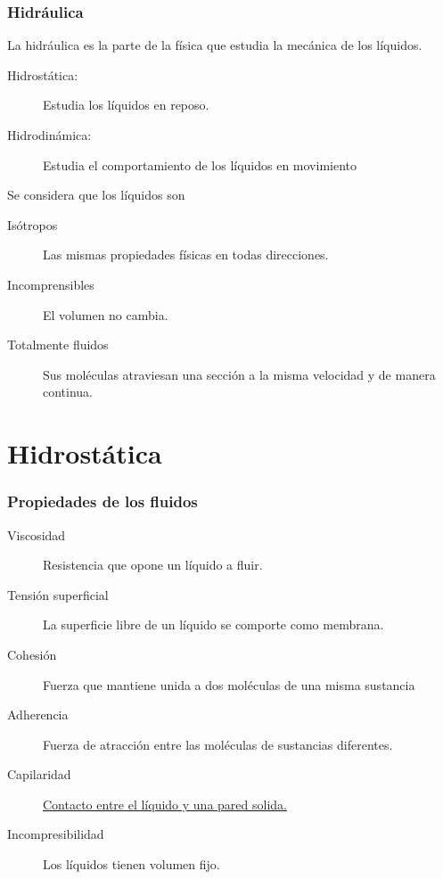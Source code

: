 \documentclass[handout]{beamer}
\begin{document}
\begin{frame}
  \frametitle{Hidráulica}  
  \begin{block}{La hidráulica}
    es la parte de la física que estudia la mecánica de los líquidos.
  \end{block}
  \begin{description}
  \item[Hidrostática:] Estudia los líquidos en reposo.
  \item[Hidrodinámica:] Estudia el comportamiento de los líquidos en movimiento
  \end{description}

  \begin{block}{Se considera que los líquidos son}
    \begin{description}
    \item[Isótropos] Las mismas propiedades físicas en todas direcciones.
    \item[Incomprensibles] El volumen no cambia.
    \item[Totalmente fluidos] Sus moléculas atraviesan una sección a la misma velocidad y
      de manera continua.
    \end{description}
  \end{block}
\end{frame}

\section{Hidrostática}

\begin{frame}
  \frametitle{Propiedades de los fluidos}
  \begin{description}
  \item[Viscosidad] Resistencia que opone un líquido a fluir.
  \item[Tensión superficial] La superficie libre de un líquido se comporte como membrana.
  \item[Cohesión ] Fuerza que mantiene unida a dos moléculas de una misma sustancia
  \item[Adherencia] Fuerza de atracción entre las moléculas de sustancias diferentes.
  \item[Capilaridad] \href{https://www.youtube.com/watch?v=s-KvoVzukHo}{Contacto entre el líquido y una pared solida.}
  \item[Incompresibilidad] Los líquidos tienen volumen fijo.
  \end{description}
\end{frame}
\end{document}

